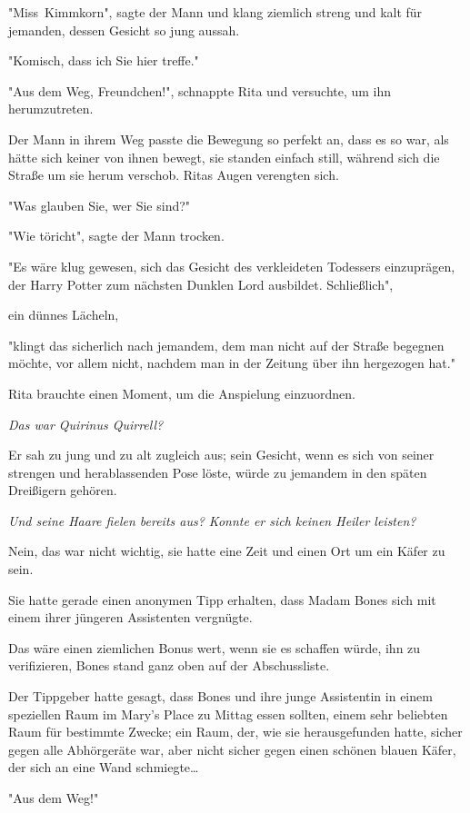 {"Miss~Kimmkorn", sagte der Mann und klang ziemlich streng und kalt für jemanden, dessen Gesicht so jung aussah.

"Komisch, dass ich Sie hier treffe."

"Aus dem Weg, Freundchen!", schnappte Rita und versuchte, um ihn herumzutreten.

Der Mann in ihrem Weg passte die Bewegung so perfekt an, dass es so war, als hätte sich keiner von ihnen bewegt, sie standen einfach still, während sich die Straße um sie herum verschob. Ritas Augen verengten sich.

"Was glauben Sie, wer Sie sind?"

"Wie töricht", sagte der Mann trocken.

"Es wäre klug gewesen, sich das Gesicht des verkleideten Todessers einzuprägen, der Harry Potter zum nächsten Dunklen Lord ausbildet. Schließlich",

ein dünnes Lächeln,

"klingt das sicherlich nach jemandem, dem man nicht auf der Straße begegnen möchte, vor allem nicht, nachdem man in der Zeitung über ihn hergezogen hat."

Rita brauchte einen Moment, um die Anspielung einzuordnen.

\emph{Das war Quirinus Quirrell?}

Er sah zu jung und zu alt zugleich aus; sein Gesicht, wenn es sich von seiner strengen und herablassenden Pose löste, würde zu jemandem in den späten Dreißigern gehören.

\emph{Und seine Haare fielen bereits aus? Konnte er sich keinen Heiler leisten?}

Nein, das war nicht wichtig, sie hatte eine Zeit und einen Ort um ein Käfer zu sein.

Sie hatte gerade einen anonymen Tipp erhalten, dass Madam Bones sich mit einem ihrer jüngeren Assistenten vergnügte.

Das wäre einen ziemlichen Bonus wert, wenn sie es schaffen würde, ihn zu verifizieren, Bones stand ganz oben auf der Abschussliste.

Der Tippgeber hatte gesagt, dass Bones und ihre junge Assistentin in einem speziellen Raum im Mary's Place zu Mittag essen sollten, einem sehr beliebten Raum für bestimmte Zwecke; ein Raum, der, wie sie herausgefunden hatte, sicher gegen alle Abhörgeräte war, aber nicht sicher gegen einen schönen blauen Käfer, der sich an eine Wand schmiegte…

"Aus dem Weg!"

}
